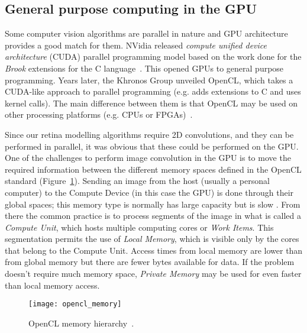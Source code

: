 

\subsection{General purpose computing in the GPU}

Some computer vision algorithms are parallel in nature and GPU architecture provides a good match for them. NVidia released \emph{compute unified device architecture} (CUDA) parallel programming model based on the work done for the \emph{Brook} extensions for the C language~\cite{buck2004brook,cuda}. This opened GPUs to general purpose programming. Years later, the Khronos Group unveiled OpenCL, which takes a CUDA-like approach to parallel programming (e.g. adds extensions to C and uses kernel calls). The main difference between them is that OpenCL may be used on other processing platforms (e.g. CPUs or FPGAs)~\cite{opencl}.

Since our retina modelling algorithms require 2D convolutions, and they can be performed in parallel, it was obvious that these could be performed on the GPU. One of the challenges to perform image convolution in the GPU is to move the required information between the different memory spaces defined in the OpenCL standard (Figure~\ref{fig:c2s:opencl-mem}). Sending an image from the host (usually a personal computer) to the Compute Device (in this case the GPU) is done through their global spaces; this memory type is normally has large capacity but is slow . 
From there the common practice is to process segments of the image in what is called a \emph{Compute Unit}, which hosts multiple computing cores or \emph{Work Items}. 
This segmentation permits the use of \emph{Local Memory}, which is visible only by the cores that belong to the Compute Unit. 
Access times from local memory are lower than from global memory but there are fewer bytes available for data. If the problem doesn't require much memory space, \emph{Private Memory} may be used for even faster than local memory access.

\begin{figure}[h]
  \begin{center}
    \texttt{[image: opencl\_memory]}
    \caption{OpenCL memory hierarchy~\cite{opencl}.}
    \label{fig:c2s:opencl-mem}
  \end{center}
\end{figure}

